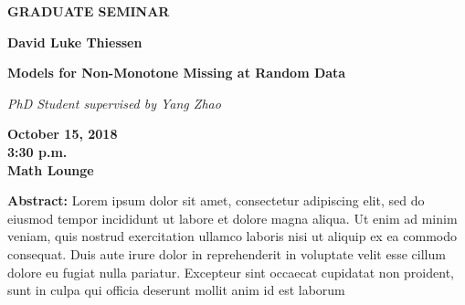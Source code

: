 \documentclass[12pt]{article}
\begin{document}
\begin{center}
\sffamily
\Huge\textbf{GRADUATE SEMINAR}

\bigskip
\LARGE\textbf{David Luke Thiessen}

\bigskip
\textbf{Models for Non-Monotone Missing at Random Data}

\bigskip
\large
\textit{PhD Student supervised by Yang Zhao}

\Large
\bigskip
\textbf{October 15, 2018
\\3:30 p.m.
\\Math Lounge
}
\end{center}

\bigskip

\sffamily\large\noindent\textbf{Abstract:} 
Lorem ipsum dolor sit amet, consectetur adipiscing elit, sed do eiusmod tempor incididunt ut labore et dolore magna aliqua. Ut enim ad minim veniam, quis nostrud exercitation ullamco laboris nisi ut aliquip ex ea commodo consequat. Duis aute irure dolor in reprehenderit in voluptate velit esse cillum dolore eu fugiat nulla pariatur. Excepteur sint occaecat cupidatat non proident, sunt in culpa qui officia deserunt mollit anim id est laborum


 
\end{document}
